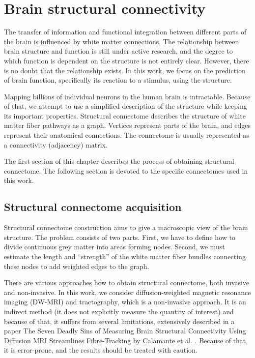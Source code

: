 \chapter{Brain structural connectivity}

The transfer of information and functional integration between different parts of the brain is influenced by white matter connections. The relationship between brain structure and function is still under active research, and the degree to which function is dependent on the structure is not entirely clear. However, there is no doubt that the relationship exists. \cite{sotiropoulos_building_2019} In this work, we focus on the prediction of brain function, specifically its reaction to a stimulus, using the structure. 

Mapping billions of individual neurons in the human brain is intractable. Because of that, we attempt to use a simplified description of the structure while keeping its important properties. Structural connectome describes the structure of white matter fiber pathways as a graph. Vertices represent parts of the brain, and edges represent their anatomical connections. The connectome is usually represented as a connectivity (adjacency) matrix. \cite{yeh_mapping_2021}

The first section of this chapter describes the process of obtaining structural connectome. The following section is devoted to the specific connectomes used in this work.

\section{Structural connectome acquisition}


Structural connectome construction aims to give a macroscopic view of the brain structure. The problem consists of two parts. First, we have to define how to divide continuous grey matter into areas forming nodes. Second, we must estimate the length and \enquote{strength} of the white matter fiber bundles connecting these nodes to add weighted edges to the graph.

There are various approaches how to obtain structural connectome, both invasive and non-invasive. In this work, we consider diffusion-weighted magnetic resonance imaging (DW-MRI) and tractography, which is a non-invasive approach. It is an indirect method (it does not explicitly measure the quantity of interest) and because of that, it suffers from several limitations, extensively described in a paper The Seven Deadly Sins of Measuring Brain Structural Connectivity Using Diffusion MRI Streamlines Fibre-Tracking by Calamante et al. \cite{calamante_seven_2019}. Because of that, it is error-prone, and the results should be treated with caution. \cite{sotiropoulos_building_2019}

